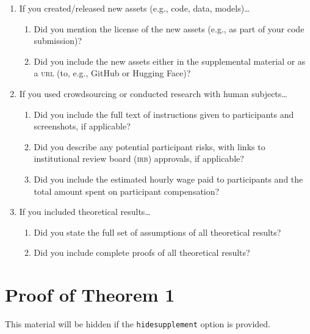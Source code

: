 \documentclass[11pt]{article}
\begin{document}
\begin{enumerate}
\begin{enumerate}
    \answerTODO{}
  \item Did you discuss whether the data you are using/curating contains
    personally identifiable information or offensive content?
    \answerTODO{}
  \end{enumerate}
\item If you created/released new assets (e.g., code, data, models)\dots
  \begin{enumerate}
    \item Did you mention the license of the new assets (e.g., as part of your
    code submission)?
    \answerTODO{}
    \item Did you include the new assets either in the supplemental material or as
    a \textsc{url} (to, e.g., GitHub or Hugging Face)?
    \answerTODO{}
  \end{enumerate}
\item If you used crowdsourcing or conducted research with human subjects\dots
  \begin{enumerate}
  \item Did you include the full text of instructions given to participants and
    screenshots, if applicable?
    \answerTODO{}
  \item Did you describe any potential participant risks, with links to
    institutional review board (\textsc{irb}) approvals, if applicable?
    \answerTODO{}
  \item Did you include the estimated hourly wage paid to participants and the
    total amount spent on participant compensation?
    \answerTODO{}
  \end{enumerate}
\item If you included theoretical results\dots
  \begin{enumerate}
  \item Did you state the full set of assumptions of all theoretical results?
    \answerTODO{}
  \item Did you include complete proofs of all theoretical results?
    \answerTODO{}
  \end{enumerate}
\end{enumerate}

\newpage
\appendix
\section{Proof of Theorem 1}

This material will be hidden if the \texttt{hidesupplement} option is provided.
\end{document}
